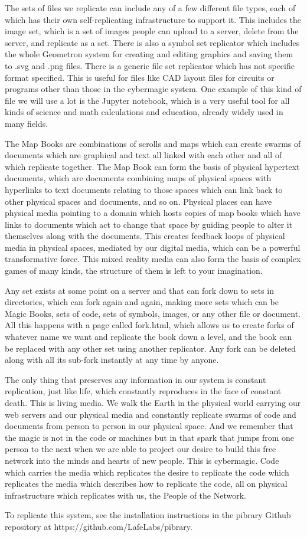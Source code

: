 The sets of files we replicate can include any of a few different file
types, each of which has their own self-replicating infrastructure to
support it. This includes the image set, which is a set of images people
can upload to a server, delete from the server, and replicate as a set.
There is also a symbol set replicator which includes the whole Geometron
system for creating and editing graphics and saving them to .svg and
.png files. There is a generic file set replicator which has not
specific format specified. This is useful for files like CAD layout
files for circuits or programs other than those in the cybermagic
system. One example of this kind of file we will use a lot is the
Jupyter notebook, which is a very useful tool for all kinds of science
and math calculations and education, already widely used in many fields.

The Map Books are combinations of scrolls and maps which can create
swarms of documents which are graphical and text all linked with each
other and all of which replicate together. The Map Book can form the
basis of physical hypertext documents, which are documents combining
maps of physical spaces with hyperlinks to text documents relating to
those spaces which can link back to other physical spaces and documents,
and so on. Physical places can have physical media pointing to a domain
which hosts copies of map books which have links to documents which act
to change that space by guiding people to alter it themselves along with
the documents. This creates feedback loops of physical media in physical
spaces, mediated by our digital media, which can be a powerful
transformative force. This mixed reality media can also form the basis
of complex games of many kinds, the structure of them is left to your
imagination.

Any set exists at some point on a server and that can fork down to sets
in directories, which can fork again and again, making more sets which
can be Magic Books, sets of code, sets of symbols, images, or any other
file or document. All this happens with a page called fork.html, which
allows us to create forks of whatever name we want and replicate the
book down a level, and the book can be replaced with any other set using
another replicator. Any fork can be deleted along with all its sub-fork
instantly at any time by anyone.

The only thing that preserves any information in our system is constant
replication, just like life, which constantly reproduces in the face of
constant death. This is living media. We walk the Earth in the physical
world carrying our web servers and our physical media and constantly
replicate swarms of code and documents from person to person in our
physical space. And we remember that the magic is not in the code or
machines but in that spark that jumps from one person to the next when
we are able to project our desire to build this free network into the
minds and hearts of new people. This is cybermagic. Code which carries
the media which replicates the desire to replicate the code which
replicates the media which describes how to replicate the code, all on
physical infrastructure which replicates with us, the People of the
Network.

To replicate this system, see the installation instructions in the
pibrary Github repository at https://github.com/LafeLabs/pibrary.
